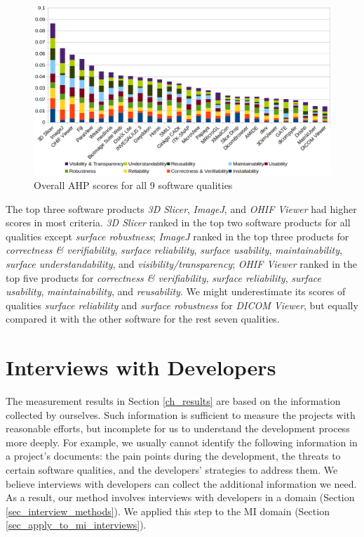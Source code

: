 \documentclass[preprint,12pt,authoryear]{elsarticle}
\begin{document}
\begin{figure}[ht]
\includegraphics[scale=0.38]{figures/overall_scores.png}
\caption{Overall AHP scores for all 9 software qualities}

\label{fg_overall_scores}
\end{figure}

The top three software products \textit{3D Slicer}, \textit{ImageJ}, and
\textit{OHIF Viewer} had higher scores in most criteria. \textit{3D Slicer}
ranked in the top two software products for all qualities except \textit{surface
robustness}; \textit{ImageJ} ranked in the top three products for
\textit{correctness \& verifiability}, \textit{surface reliability},
\textit{surface usability}, \textit{maintainability}, \textit{ surface
understandability}, and \textit{visibility/transparency}; \textit{OHIF Viewer}
ranked in the top five products for \textit{correctness \& verifiability},
\textit{surface reliability}, \textit{surface usability},
\textit{maintainability}, and \textit{reusability}. We might underestimate its
scores of qualities \textit{surface reliability} and \textit{surface robustness}
for \textit{DICOM Viewer}, but equally compared it with the other software for
the rest seven qualities.

\section{Interviews with Developers} \label{ch_interview}

The measurement results in Section \ref{ch_results} are based on the information
collected by ourselves. Such information is sufficient to measure the projects
with reasonable efforts, but incomplete for us to understand the development
process more deeply. For example, we usually cannot identify the following
information in a project's documents: the pain points during the development,
the threats to certain software qualities, and the developers' strategies to
address them. We believe interviews with developers can collect the additional
information we need. As a result, our method involves interviews with developers
in a domain (Section \ref{sec_interview_methods}). We applied this step to the
MI domain (Section \ref{sec_apply_to_mi_interviews}).
\end{document}
